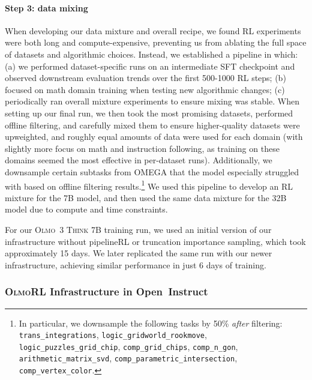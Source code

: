 \documentclass[table]{ai2style/ai2}
\newcommand{\newOlmo}{Olmo\xspace}
\newcommand{\olmothreerl}{\textsc{\newOlmo{}RL}\xspace}
\newcommand{\openinstruct}{{Open~Instruct}\xspace}
\newcommand{\olmothreethinking}{\textsc{Olmo~3 Think}\xspace}
\begin{document}
\paragraph{Step 3: data mixing}
When developing our data mixture and overall recipe, we found RL experiments were both long and compute-expensive, preventing us from ablating the full space of datasets and algorithmic choices.
Instead, we established a pipeline in which: (a) we performed dataset-specific runs on an intermediate SFT checkpoint and observed downstream evaluation trends over the first 500-1000 RL steps; (b) focused on math domain training when testing new algorithmic changes; (c) periodically ran overall mixture experiments to ensure mixing was stable.
When setting up our final run, we then took the most promising datasets, performed offline filtering, and carefully mixed them to ensure higher-quality datasets were upweighted, and roughly equal amounts of data were used for each domain (with slightly more focus on math and instruction following, as training on these domains seemed the most effective in per-dataset runs).
Additionally, we downsample certain subtasks from OMEGA that the model especially struggled with based on offline filtering results.\footnote{In particular, we downsample the following tasks by 50\% \textit{after} filtering: \texttt{trans\_integrations}, \texttt{logic\_gridworld\_rookmove}, \texttt{logic\_puzzles\_grid\_chip}, \texttt{comp\_grid\_chips}, \texttt{comp\_n\_gon}, \texttt{arithmetic\_matrix\_svd}, \texttt{comp\_parametric\_intersection}, \texttt{comp\_vertex\_color}.}
We used this pipeline to develop an RL mixture for the 7B model, and then used the same data mixture for the 32B model due to compute and time constraints.

For our \olmothreethinking 7B training run, we used an initial version of our infrastructure without pipelineRL or truncation importance sampling, which took approximately 15 days. We later replicated the same run with our newer infrastructure, achieving similar performance in just 6 days of training.

\subsubsection{\olmothreerl Infrastructure in \openinstruct}
\label{sec:posttraining_infra}
\end{document}
